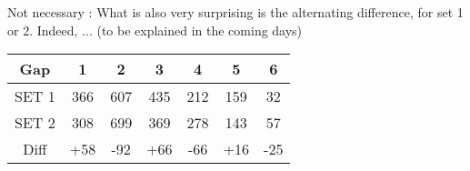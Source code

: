 Not necessary :
What is also very surprising is the alternating difference, for set 1 or 2. Indeed, ... (to be explained in the coming days)
\begin{center}
\begin{tabular}{|c|c|c|c|c|c|c|}
    \hline
    Gap & 1 & 2 & 3 & 4 & 5 & 6  \\
    \hline
    SET 1 & 366 & 607 & 435 & 212 & 159 & 32  \\
    SET 2 & 308 & 699 & 369 & 278 & 143 & 57  \\
    \hline
    Diff  & +58 & -92 & +66 & -66 & +16 & -25  \\
    \hline
\end{tabular}   
\end{center}